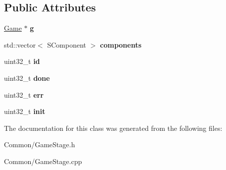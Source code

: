 \subsection*{Public Attributes}
\begin{DoxyCompactItemize}
\item 
\hypertarget{classbali_1_1_game_stage_acb6dc0c94a2a2c3e51c06d4a4cc18323}{\hyperlink{classbali_1_1_game}{Game} $\ast$ {\bfseries g}}\label{classbali_1_1_game_stage_acb6dc0c94a2a2c3e51c06d4a4cc18323}

\item 
\hypertarget{classbali_1_1_game_stage_a402549fd2a8d1a86de09dc8b0895b9a4}{std\-::vector$<$ S\-Component $>$ {\bfseries components}}\label{classbali_1_1_game_stage_a402549fd2a8d1a86de09dc8b0895b9a4}

\item 
\hypertarget{classbali_1_1_game_stage_a09ba67eaec1339922d2f50c897ef45ac}{uint32\-\_\-t {\bfseries id}}\label{classbali_1_1_game_stage_a09ba67eaec1339922d2f50c897ef45ac}

\item 
\hypertarget{classbali_1_1_game_stage_a3cacb5d8264d0e3415f51df22aa96620}{uint32\-\_\-t {\bfseries done}}\label{classbali_1_1_game_stage_a3cacb5d8264d0e3415f51df22aa96620}

\item 
\hypertarget{classbali_1_1_game_stage_a1d9b13f5d3c3146287c8975cd3578cdc}{uint32\-\_\-t {\bfseries err}}\label{classbali_1_1_game_stage_a1d9b13f5d3c3146287c8975cd3578cdc}

\item 
\hypertarget{classbali_1_1_game_stage_a3b1fe5201aae44760531ee20dc147a92}{uint32\-\_\-t {\bfseries init}}\label{classbali_1_1_game_stage_a3b1fe5201aae44760531ee20dc147a92}

\end{DoxyCompactItemize}


The documentation for this class was generated from the following files\-:\begin{DoxyCompactItemize}
\item 
Common/Game\-Stage.\-h\item 
Common/Game\-Stage.\-cpp\end{DoxyCompactItemize}
